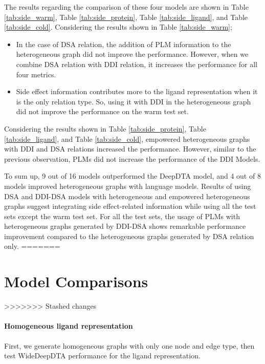 

\newpage
The results regarding the comparison of these four models are shown in Table \ref{tab:side_warm}, Table \ref{tab:side_protein}, Table  \ref{tab:side_ligand}, and Table \ref{tab:side_cold}. Considering the results shown in Table \ref{tab:side_warm};

\begin{itemize}
    \item In the case of DSA relation, the addition of PLM information to the heterogeneous graph did not improve the performance. However, when we combine DSA relation with DDI relation, it increases the performance for all four metrics. 
    \item Side effect information contributes more to the ligand representation when it is the only relation type. So, using it with DDI in the heterogeneous graph did not improve the performance on the warm test set.
\end{itemize}

Considering the results shown in Table \ref{tab:side_protein}, Table \ref{tab:side_ligand}, and Table \ref{tab:side_cold}, empowered heterogeneous graphs with DDI and DSA relations increased the performance. However, similar to the previous observation, PLMs did not increase the performance of the DDI Models. 





To sum up, 9 out of 16 models outperformed the DeepDTA model, and 4 out of 8 models improved heterogeneous graphs with language models. Results of using DSA and DDI-DSA models with heterogeneous and empowered heterogeneous graphs suggest integrating side effect-related information while using all the test sets except the warm test set. For all the test sets, the usage of PLMs with heterogeneous graphs generated by DDI-DSA shows remarkable performance improvement compared to the heterogeneous graphs generated by DSA relation only.
=======
\section{Model Comparisons}

>>>>>>> Stashed changes
\paragraph{Homogeneous ligand representation}
First, we generate homogeneous graphs with only one node and edge type, then test WideDeepDTA performance for the ligand representation.

